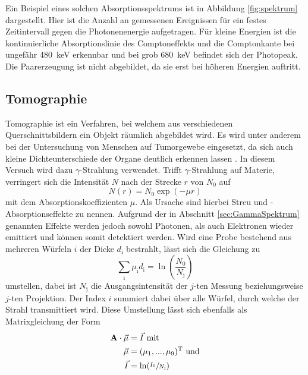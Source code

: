 Ein Beispiel eines solchen Absorptionsspektrums ist in Abbildung \ref{fig:spektrum}
dargestellt. Hier ist die Anzahl an gemessenen Ereignissen für ein
festes Zeitintervall gegen die Photonenenergie aufgetragen.
Für kleine Energien ist die kontinuierliche Absorptionslinie des Comptoneffekts
und die Comptonkante bei ungefähr \SI{480}{\kilo\electronvolt} erkennbar
und bei grob \SI{680}{\kilo\electronvolt}
befindet sich der Photopeak. Die Paarerzeugung ist nicht abgebildet,
da sie erst bei höheren Energien auftritt.


\subsection{Tomographie}
\label{sec:Tomographie}

Tomographie ist ein Verfahren, bei welchem aus verschiedenen
Querschnittsbildern ein Objekt räumlich abgebildet wird.
Es wird unter anderem bei der Untersuchung von Menschen auf Tumorgewebe eingesetzt,
da sich auch kleine Dichteunterschiede der Organe deutlich erkennen lassen \cite{paradisi}.
In diesem Versuch wird dazu $\gamma$-Strahlung verwendet.
Trifft $\gamma$-Strahlung auf Materie, verringert sich die Intensität $N$
nach der Strecke $r$ von $N_0$ auf
\begin{equation*}
  N\left(r\right) = N_0 \exp\left(-\mu r\right)
\end{equation*}
mit dem Absorptionskoeffizienten $\mu$.
Als Ursache sind hierbei Streu und -Absorptionseffekte zu nennen.
Aufgrund der in Abschnitt \ref{sec:GammaSpektrum} genannten Effekte werden
jedoch sowohl Photonen, als auch Elektronen wieder emittiert und können
somit detektiert werden.
Wird eine Probe bestehend aus
mehreren Würfeln $i$ der Dicke $d_\text{i}$ bestrahlt, lässt sich
die Gleichung zu
\begin{equation*}
  \sum_\text{i} \mu_\text{i} d_\text{i} = \ln\left(\frac{N_0}{N_\text{j}}\right)
\end{equation*}
umstellen, dabei ist $N_\text{j}$ die Ausgangsintensität der $j$-ten Messung
beziehungsweise $j$-ten Projektion.
Der Index $i$ summiert dabei über alle Würfel, durch welche der Strahl
transmittiert wird.
Diese Umstellung lässt sich ebenfalls als Matrixgleichung der
Form
\begin{equation}
  \begin{aligned}
    \mathbf{A} \cdot \vec{\mu} &= \vec{I} \text{ mit} \\
    \vec{\mu} &= (\mu_1,...,\mu_9)^\text{T} \text{ und} \\
    \vec{I} &= \ln(\sfrac{I_0}{N_\text{j}})
  \end{aligned}
  \label{eqn:matrixform}
\end{equation}
